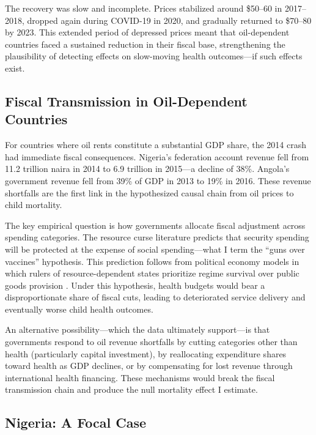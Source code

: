 \documentclass[12pt]{article}
\begin{document}
The recovery was slow and incomplete. Prices stabilized around \$50--60 in 2017--2018, dropped again during COVID-19 in 2020, and gradually returned to \$70--80 by 2023. This extended period of depressed prices meant that oil-dependent countries faced a sustained reduction in their fiscal base, strengthening the plausibility of detecting effects on slow-moving health outcomes---if such effects exist.

\subsection{Fiscal Transmission in Oil-Dependent Countries}

For countries where oil rents constitute a substantial GDP share, the 2014 crash had immediate fiscal consequences. Nigeria's federation account revenue fell from 11.2 trillion naira in 2014 to 6.9 trillion in 2015---a decline of 38\%. Angola's government revenue fell from 39\% of GDP in 2013 to 19\% in 2016. These revenue shortfalls are the first link in the hypothesized causal chain from oil prices to child mortality.

The key empirical question is how governments allocate fiscal adjustment across spending categories. The resource curse literature predicts that security spending will be protected at the expense of social spending---what I term the ``guns over vaccines'' hypothesis. This prediction follows from political economy models in which rulers of resource-dependent states prioritize regime survival over public goods provision \citep{besley2011pillars, acemoglu2001colonial}. Under this hypothesis, health budgets would bear a disproportionate share of fiscal cuts, leading to deteriorated service delivery and eventually worse child health outcomes.

An alternative possibility---which the data ultimately support---is that governments respond to oil revenue shortfalls by cutting categories other than health (particularly capital investment), by reallocating expenditure shares toward health as GDP declines, or by compensating for lost revenue through international health financing. These mechanisms would break the fiscal transmission chain and produce the null mortality effect I estimate.

\subsection{Nigeria: A Focal Case}
\end{document}
